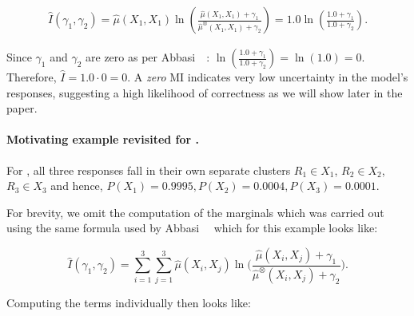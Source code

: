 \begin{align*}
    \hat{I}(\gamma_1, \gamma_2) = \hat{\mu}(X_1, X_1) \ln \left( \frac{\hat{\mu}(X_1, X_1) + \gamma_1}{\hat{\mu}^\otimes(X_1, X_1) + \gamma_2} \right) 
    = 1.0 \ln \left( \frac{1.0 + \gamma_1}{1.0 + \gamma_2} \right).
\end{align*}

Since $\gamma_1$ and $\gamma_2$ are zero as per Abbasi~\etal~\cite{abbasi2024believe}:
   $\ln \left( \frac{1.0 + \gamma_1}{1.0 + \gamma_2} \right) = \ln(1.0) = 0$.
Therefore, $\hat{I} = 1.0 \cdot 0 = 0$.
%
%
A \emph{zero} MI indicates very low uncertainty in the model's responses, suggesting a high likelihood of correctness as we will show later in the paper.

\paragraph{Motivating example revisited for \textnormal{\salesforce}.}
For \codegenmonoC, all three responses fall in their own separate clusters \ie  $R_1 \in X_1$, $R_2 \in X_2$, $R_3 \in X_3$ and hence,
%
    $P(X_1) = 0.9995, P(X_2) = 0.0004, P(X_3) = 0.0001$.

For brevity, we omit the computation of the marginals which was carried out using the same formula used by Abbasi~\etal~\cite{abbasi2024believe} which for this example looks like:

\[
\hat{I}(\gamma_1, \gamma_2)
= \sum_{i=1}^3 \sum_{j=1}^3
  \hat{\mu}(X_i, X_j)
  \ln\!\Biggl(\frac{\hat{\mu}(X_i, X_j) + \gamma_1}
                   {\hat{\mu}^\otimes(X_i, X_j) + \gamma_2}\Biggr).
\]

Computing the terms individually then looks like:

